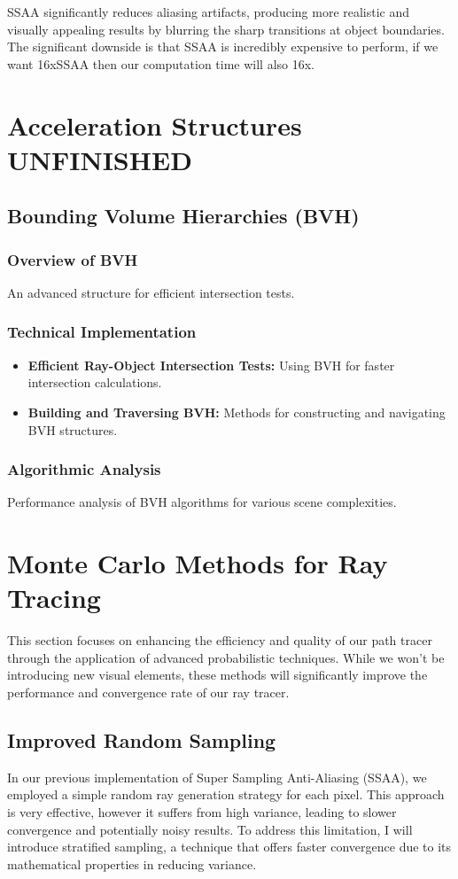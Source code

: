\documentclass[12pt]{article}
\begin{document}
SSAA significantly reduces aliasing artifacts, producing more realistic and visually appealing results by blurring the sharp transitions at object boundaries. The significant downside is that SSAA is incredibly expensive to perform, if we want 16xSSAA then our computation time will also 16x.

\section{Acceleration Structures UNFINISHED}
\label{sec:acceleration-structures}
\subsection{Bounding Volume Hierarchies (BVH)}
\subsubsection{Overview of BVH}
An advanced structure for efficient intersection tests.
\subsubsection{Technical Implementation}
\begin{itemize}
    \item \textbf{Efficient Ray-Object Intersection Tests:} Using BVH for faster intersection calculations.
    \item \textbf{Building and Traversing BVH:} Methods for constructing and navigating BVH structures.
\end{itemize}
\subsubsection{Algorithmic Analysis}
Performance analysis of BVH algorithms for various scene complexities.

\section{Monte Carlo Methods for Ray Tracing}
\label{sec:monte-carlo}

This section focuses on enhancing the efficiency and quality of our path tracer through the application of advanced probabilistic techniques. While we won't be introducing new visual elements, these methods will significantly improve the performance and convergence rate of our ray tracer.

\subsection{Improved Random Sampling}
In our previous implementation of Super Sampling Anti-Aliasing (SSAA), we employed a simple random ray generation strategy for each pixel. This approach is very effective, however it suffers from high variance, leading to slower convergence and potentially noisy results. To address this limitation, I will introduce stratified sampling, a technique that offers faster convergence due to its mathematical properties in reducing variance.
\end{document}
